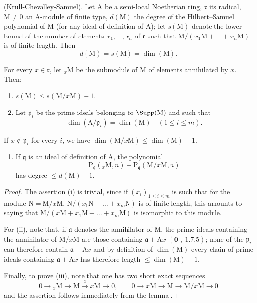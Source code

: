 \begin{theorem}[16.2.3]
\label{0.16.2.3}
\textup{(Krull-Chevalley-Samuel).}
Let $\mathrm{A}$ be a semi-local Noetherian ring, $\mathfrak{r}$ its radical, $\mathrm{M}\neq 0$ an $\mathrm{A}$-module of finite type, $d(\mathrm{M})$ the degree of the Hilbert--Samuel polynomial of $\mathrm{M}$ (for any ideal of definition of $\mathrm{A}$); let $s(\mathrm{M})$ denote the lower bound of the number of elements $x_1,\ldots,x_n$ of $\mathfrak{r}$ such that $\mathrm{M}/(x_1\mathrm{M}+\ldots+x_n\mathrm{M})$ is of finite length.
Then
\[
  d(\mathrm{M})=s(\mathrm{M})=\dim(\mathrm{M}).
\]
\end{theorem}

\begin{lemma}[16.2.3.1]
\label{0.16.2.3.1}
For every $x\in\mathfrak{r}$, let ${}_x\mathrm{M}$ be the submodule of $\mathrm{M}$ of elements annihilated by $x$.
Then:
\begin{enumerate}
  \item[\rm{(i)}] $s(\mathrm{M})\leq s(\mathrm{M}/x\mathrm{M})+1$.
  \item[\rm{(ii)}] Let $\mathfrak{p}_i$ be the prime ideals belonging to $\Supp(\mathrm{M})$ and such that
  \[
    \dim(\mathrm{A}/\mathfrak{p}_i)=\dim(\mathrm{M})\quad(1\leq i\leq m).
  \]
\end{enumerate}
If $x\notin\mathfrak{p}_i$ for every $i$, we have $\dim(\mathrm{M}/x\mathrm{M})\leq\dim(\mathrm{M})-1$.
\begin{enumerate}
  \item[\rm{(iii)}] If $\mathfrak{q}$ is an ideal of definition of $\mathrm{A}$, the polynomial
  \[
    \mathrm{P}_\mathfrak{q}({}_x\mathrm{M},n)-\mathrm{P}_\mathfrak{q}(\mathrm{M}/x\mathrm{M},n)
  \]
  has degree $\leq d(\mathrm{M})-1$.
\end{enumerate}
\end{lemma}

\begin{proof}
The assertion (i) is trivial, since if $(x_i)_{1\leq i\leq m}$ is such that for the module $\mathrm{N}=\mathrm{M}/x\mathrm{M}$, $\mathrm{N}/(x_1\mathrm{N}+\ldots+x_m\mathrm{N})$ is of finite length, this amounts to saying that $\mathrm{M}/(x\mathrm{M}+x_1\mathrm{M}+\ldots+x_m\mathrm{M})$ is isomorphic to this module.

For (ii), note that, if $\mathfrak{a}$ denotes the annihilator of $\mathrm{M}$, the prime ideals containing the annihilator of $\mathrm{M}/x\mathrm{M}$ are those containing $\mathfrak{a}+\mathrm{A}x$ $(\mathbf{0}_\mathrm{I},~1.7.5)$; none of the $\mathfrak{p}_i$ can therefore contain $\mathfrak{a}+\mathrm{A}x$ and by definition of $\dim(\mathrm{M})$  every chain of prime ideals containing $\mathfrak{a}+\mathrm{A}x$ has therefore length $\leq\dim(\mathrm{M})-1$.


Finally, to prove (iii), note that one has two short exact sequences
\[
  0\to{}_x\mathrm{M}\to\mathrm{M}\xrightarrow{x}x\mathrm{M}\to 0,\qquad 0\to x\mathrm{M}\to\mathrm{M}\to\mathrm{M}/x\mathrm{M}\to 0
\]
and the assertion follows immediately from the lemma .
\end{proof}

